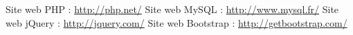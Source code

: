 \documentclass{sigplanconf}
\begin{document}







\begin{thebibliography}{}
\softraggedright
{} Site web PHP : \url{http://php.net/}
 Site web MySQL : \url{http://www.mysql.fr/}
 Site web jQuery : \url{http://jquery.com/}
 Site web Bootstrap : \url{http://getbootstrap.com/}

\end{thebibliography}
\end{document}

